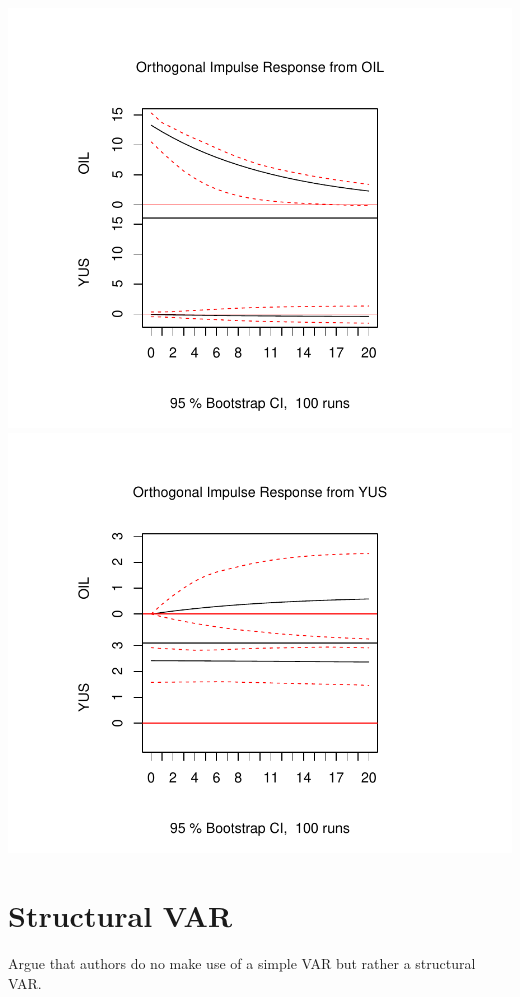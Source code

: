 \documentclass[11pt,preprint, authoryear]{elsarticle}
\numberwithin{equation}{section}
\numberwithin{figure}{section}
\numberwithin{table}{section}
\begin{document}
\includegraphics{replication_files/figure-latex/unnamed-chunk-7-1.pdf}
\includegraphics{replication_files/figure-latex/unnamed-chunk-7-2.pdf}

\hypertarget{structural-var}{%
\section{Structural VAR}\label{structural-var}}

Argue that authors do no make use of a simple VAR but rather a
structural VAR.
\end{document}
